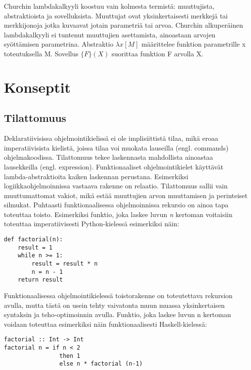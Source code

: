 Churchin lambdakalkyyli koostuu vain kolmesta termistä: muuttujista, abstraktioista ja sovelluksista.
Muuttujat ovat yksinkertaisesti merkkejä tai merkkijonoja jotka kuvaavat jotain parametriä tai arvoa. Churchin
alkuperäinen lambdakalkyyli ei tuntenut muuttujien asettamista, ainoastaan arvojen syöttämisen parametrina. Abstraktio
$ \lambda x [ M ] $ määrittelee funktion parametrille x toteutuksella M. Sovellus $ \{ F \} ( X ) $ suorittaa funktion F
arvolla X. \cite{lambdacalculus}


\section{Konseptit}

\subsection{Tilattomuus}
Deklaratiivisissa ohjelmointikielissä ei ole implisiittistä tilaa, mikä eroaa imperatiivisista kielistä, joissa tilaa
voi muokata lauseilla (engl. commands) ohjelmakoodissa. Tilattomuus tekee laskennasta mahdollista ainoastaa
lausekkeilla (engl. expression). Funktionaaliset ohjelmointikielet käyttävät lambda-abstraktioita kaiken laskennan
perustana. Esimerkiksi logiikkaohjelmoinnissa vastaava rakenne on relaatio. Tilattomuus sallii vain muuttumattomat
vakiot, mikä estää muuttujien arvon muuttamisen ja perinteiset silmukat. Puhtaasti funktionaalisessa ohjelmoinnissa
rekursio on ainoa tapa toteuttaa toisto. Esimerkiksi funktio, joka laskee luvun \textit{n} kertoman voitaisiin toteuttaa
imperatiivisesti Python-kielessä esimerkiksi näin:
\begin{verbatim}
def factorial(n):
    result = 1
    while n >= 1:
        result = result * n
        n = n - 1
    return result
\end{verbatim}
Funktionaalisessa ohjelmointikielessä toistorakenne on toteutettava rekursion avulla, mutta tästä on usein tehty
vaivatonta muun muassa yksinkertaisen syntaksin ja teho-optimoinnin avulla. \cite{hudak} Funktio, joka laskee luvun n
kertoman voidaan toteuttaa esimerkiksi näin funktionaalisesti Haskell-kielessä:
\begin{verbatim}
factorial :: Int -> Int
factorial n = if n < 2
                then 1
                else n * factorial (n-1)
\end{verbatim}

